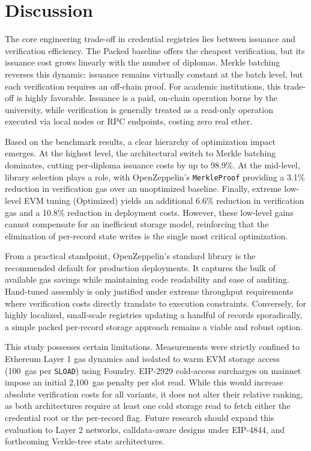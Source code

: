 \documentclass[conference]{IEEEtran}
\newcommand{\Vpacked}{Packed}
\newcommand{\Vopt}{Optimized}
\begin{document}
\section{Discussion}
\label{sec:discussion}

The core engineering trade-off in credential registries lies between 
issuance and verification efficiency. The \Vpacked{} baseline offers 
the cheapest verification, but its issuance cost grows linearly with 
the number of diplomas. Merkle batching reverses this dynamic: 
issuance remains virtually constant at the batch level, but each 
verification requires an off-chain proof. For academic institutions, 
this trade-off is highly favorable. Issuance is a paid, on-chain 
operation borne by the university, while verification is generally 
treated as a read-only operation executed via local nodes or RPC 
endpoints, costing zero real ether.

Based on the benchmark results, a clear hierarchy of optimization 
impact emerges. At the highest level, the architectural switch to 
Merkle batching dominates, cutting per-diploma issuance costs by 
up to 98.9\%. At the mid-level, library selection plays a role, with 
OpenZeppelin's \texttt{MerkleProof} providing a 3.1\% reduction in 
verification gas over an unoptimized baseline. Finally, extreme 
low-level EVM tuning (\Vopt{}) yields an additional 6.6\% reduction 
in verification gas and a 10.8\% reduction in deployment costs. 
However, these low-level gains cannot compensate for an inefficient 
storage model, reinforcing that the elimination of per-record state 
writes is the single most critical optimization.

From a practical standpoint, OpenZeppelin's standard library is the 
recommended default for production deployments. It captures the bulk 
of available gas savings while maintaining code readability and ease 
of auditing. Hand-tuned assembly is only justified under extreme 
throughput requirements where verification costs directly translate 
to execution constraints. Conversely, for highly localized, small-scale 
registries updating a handful of records sporadically, a simple packed 
per-record storage approach remains a viable and robust option.

This study possesses certain limitations. Measurements were strictly 
confined to Ethereum Layer 1 gas dynamics and isolated to warm EVM 
storage access (100~gas per \texttt{SLOAD}) using Foundry. EIP-2929 
cold-access surcharges on mainnet impose an initial 2{,}100~gas penalty 
per slot read. While this would increase absolute verification costs 
for all variants, it does not alter their relative ranking, as both 
architectures require at least one cold storage read to fetch either 
the credential root or the per-record flag. Future research should expand 
this evaluation to Layer 2 networks, calldata-aware designs under 
EIP-4844, and forthcoming Verkle-tree state architectures.
\end{document}
